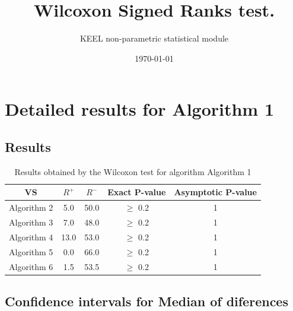 \documentclass[a4paper,10pt]{article}
\title{Wilcoxon Signed Ranks test.}
\date{\today}
\author{KEEL non-parametric statistical module}
\begin{document}
\pagestyle{empty}
\maketitle
\thispagestyle{empty}



\section{Detailed results for Algorithm 1}


\subsection{Results}

\begin{table}[!htp]
\centering\small
\begin{tabular}{
|c|c|c|c|c|}
\hline
 VS & $R^{+}$ & $R^{-}$ & Exact P-value & Asymptotic P-value \\ \hline 
Algorithm 2 & 5.0 & 50.0 & $\geq$ 0.2 & 1\\ \hline 
Algorithm 3 & 7.0 & 48.0 & $\geq$ 0.2 & 1\\ \hline 
Algorithm 4 & 13.0 & 53.0 & $\geq$ 0.2 & 1\\ \hline 
Algorithm 5 & 0.0 & 66.0 & $\geq$ 0.2 & 1\\ \hline 
Algorithm 6 & 1.5 & 53.5 & $\geq$ 0.2 & 1\\ \hline 

\end{tabular}
\caption{Results obtained by the Wilcoxon test for algorithm Algorithm 1}
\end{table}

\subsection{Confidence intervals for Median of diferences}
\end{document}
